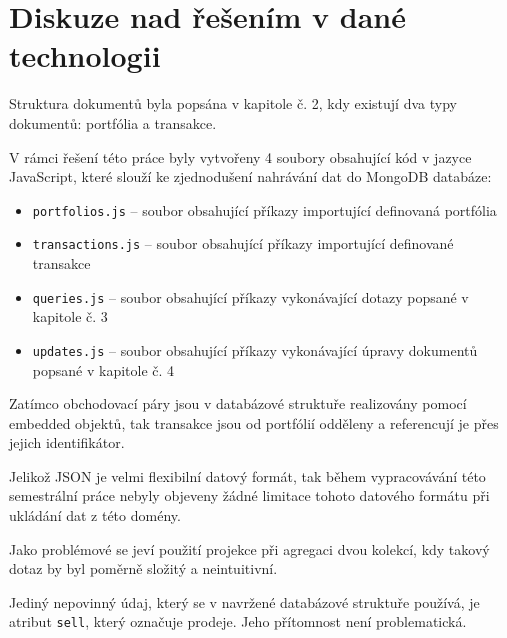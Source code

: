 \documentclass[12pt, a4paper]{article}
\let\oldsection\section
\renewcommand\section{\clearpage\oldsection}
\begin{document}
\section{Diskuze nad řešením v dané technologii}
Struktura dokumentů byla popsána v kapitole č. 2, kdy existují dva typy dokumentů: portfólia a transakce. 

V rámci řešení této práce byly vytvořeny 4 soubory obsahující kód v jazyce JavaScript, které slouží ke zjednodušení nahrávání dat do MongoDB databáze:

\begin{itemize}
    \item \texttt{portfolios.js} -- soubor obsahující příkazy importující definovaná portfólia
    \item \texttt{transactions.js} -- soubor obsahující příkazy importující definované transakce
    \item \texttt{queries.js} -- soubor obsahující příkazy vykonávající dotazy popsané v kapitole č. 3
    \item \texttt{updates.js} -- soubor obsahující příkazy vykonávající úpravy dokumentů popsané v kapitole č. 4
\end{itemize}

Zatímco obchodovací páry jsou v databázové struktuře realizovány pomocí embedded objektů, tak transakce jsou od portfólií odděleny a referencují je přes jejich identifikátor.

Jelikož JSON je velmi flexibilní datový formát, tak během vypracovávání této semestrální práce nebyly objeveny žádné limitace tohoto datového formátu při ukládání dat z této domény.

Jako problémové se jeví použití projekce při agregaci dvou kolekcí, kdy takový dotaz by byl poměrně složitý a neintuitivní.

Jediný nepovinný údaj, který se v navržené databázové struktuře používá, je atribut \texttt{sell}, který označuje prodeje. Jeho přítomnost není problematická.
\end{document}
